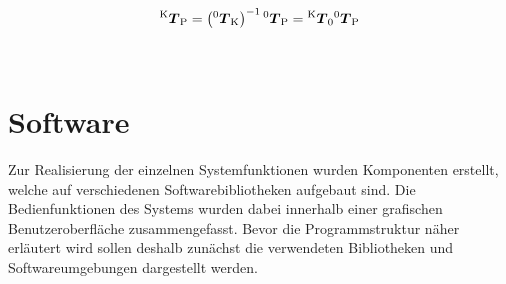 \begin{equation}
{^{\mathrm{K}}\mbox{\boldmath{$T$}}_{\mathrm{P}}} = \left( {^{\mathrm{0}}\mbox{\boldmath{$T$}}_{\mathrm{K}}} \right)^{-1} {^{\mathrm{0}}\mbox{\boldmath{$T$}}_{\mathrm{P}}} = {^{\mathrm{K}}\mbox{\boldmath{$T$}}_{\mathrm{0}}} {^{\mathrm{0}}\mbox{\boldmath{$T$}}_{\mathrm{P}}}
\end{equation}

\\



\red[Transformationen:\\
Map = World\\
World -> BaseLink -> CameraLink -> Camera\\
Camera -> Projector\\
Projector -> IntrinsicProj\\
World -> Objects\\
World -> ARMarker (eq. to Objects)\\
]

\section{Software}
Zur Realisierung der einzelnen Systemfunktionen wurden Komponenten erstellt, welche auf verschiedenen Softwarebibliotheken aufgebaut sind. Die Bedienfunktionen des Systems wurden dabei innerhalb einer grafischen Benutzeroberfläche zusammengefasst. Bevor die Programmstruktur näher erläutert wird sollen deshalb zunächst die verwendeten Bibliotheken und Softwareumgebungen dargestellt werden.

